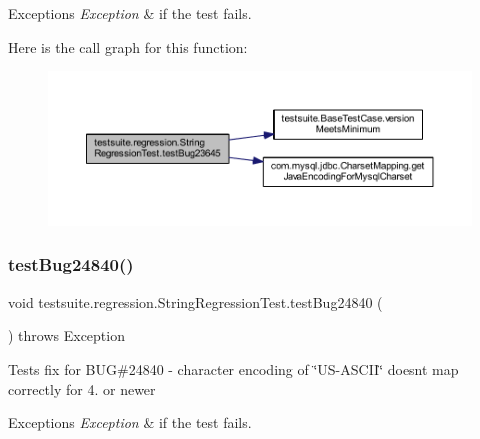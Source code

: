 \begin{DoxyExceptions}{Exceptions}
{\em Exception} & if the test fails. \\
\hline
\end{DoxyExceptions}
Here is the call graph for this function\+:
\nopagebreak
\begin{figure}[H]
\begin{center}
\leavevmode
\includegraphics[width=350pt]{classtestsuite_1_1regression_1_1_string_regression_test_a0b910fb41d304e6b938f8908dfffe0bf_cgraph}
\end{center}
\end{figure}
\mbox{\label{classtestsuite_1_1regression_1_1_string_regression_test_a64fc08a013f1e23f5fcaaeecb3681aa5}} 
\subsubsection{\texorpdfstring{test\+Bug24840()}{testBug24840()}}
{\footnotesize\ttfamily void testsuite.\+regression.\+String\+Regression\+Test.\+test\+Bug24840 (\begin{DoxyParamCaption}{ }\end{DoxyParamCaption}) throws Exception}

Tests fix for B\+UG\#24840 -\/ character encoding of \char`\"{}\+U\+S-\/\+A\+S\+C\+I\+I\char`\"{} doesn\textquotesingle{}t map correctly for 4. or newer


\begin{DoxyExceptions}{Exceptions}
{\em Exception} & if the test fails. \\
\hline
\end{DoxyExceptions}
\mbox{\label{classtestsuite_1_1regression_1_1_string_regression_test_a310d7878e44bc9bf13daa040be2bb847}} 
